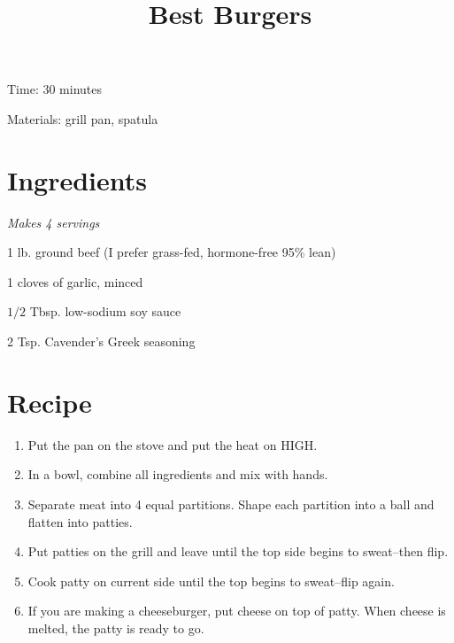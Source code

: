 \documentclass{article}
\title{Best Burgers}
\begin{document}
Time: 30 minutes

Materials: grill pan, spatula

\section{Ingredients}
\textit{Makes 4 servings}

1 lb. ground beef (I prefer grass-fed, hormone-free 95\% lean)

1 cloves of garlic, minced

$1/2$ Tbsp. low-sodium soy sauce

2 Tsp. Cavender's Greek seasoning

\section{Recipe}
\begin{enumerate}
\item{Put the pan on the stove and put the heat on HIGH.}
\item{In a bowl, combine all ingredients and mix with hands.}
\item{Separate meat into 4 equal partitions. Shape each partition into a ball and flatten into patties.}
\item{Put patties on the grill and leave until the top side begins to sweat--then flip.}
\item{Cook patty on current side until the top begins to sweat--flip again.}
\item{If you are making a cheeseburger, put cheese on top of patty. When cheese is melted, the patty is ready to go.}
\end{enumerate}
\end{document}
